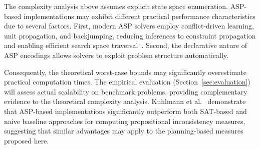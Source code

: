 The complexity analysis above assumes explicit state space enumeration. \ac{ASP}-based implementations may exhibit different practical performance characteristics due to several factors. First, modern \ac{ASP} solvers employ conflict-driven learning, unit propagation, and backjumping, reducing inferences to constraint propagation and enabling efficient search space traversal~\cite{Gebser2012}. Second, the declarative nature of \ac{ASP} encodings allows solvers to exploit problem structure automatically.

Consequently, the theoretical worst-case bounds may significantly overestimate practical computation times. The empirical evaluation (Section~\ref{sec:evaluation}) will assess actual scalability on benchmark problems, providing complementary evidence to the theoretical complexity analysis. Kuhlmann et al.~\cite{Kuhlmann2025} demonstrate that \ac{ASP}-based implementations significantly outperform both \ac{SAT}-based and naive baseline approaches for computing propositional inconsistency measures, suggesting that similar advantages may apply to the planning-based measures proposed here.
